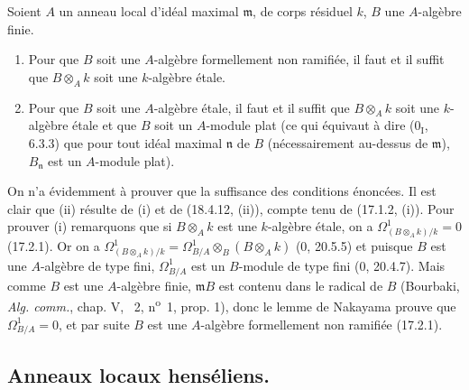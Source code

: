 \begin{corollary}[18.4.14]
\label{IV.18.4.14}
Soient $A$ un anneau local d'idéal maximal $\mathfrak m$, de corps résiduel $k$, $B$ une $A$-algèbre finie.


\begin{enumerate}
  \item[(i)] Pour que $B$ soit une $A$-algèbre formellement non ramifiée, il faut et il suffit que $B\otimes_A k$ soit une $k$-algèbre étale.
  \item[(ii)] Pour que $B$ soit une $A$-algèbre étale, il faut et il suffit que $B\otimes_A k$ soit une $k$-algèbre étale et que $B$ soit un $A$-module plat (ce qui équivaut à dire ($0_{\mathrm I}$, 6.3.3) que pour tout idéal maximal $\mathfrak n$ de $B$ (nécessairement au-dessus de $\mathfrak m$), $B_{\mathfrak n}$ est un $A$-module plat).
\end{enumerate}
\end{corollary}

On n'a évidemment à prouver que la suffisance des conditions énoncées. Il est clair que (ii) résulte de (i) et de (18.4.12, (ii)), compte tenu de (17.1.2, (i)). Pour prouver (i) remarquons que si $B\otimes_A k$ est une $k$-algèbre étale, on a $\Omega^1_{(B\otimes_A k)/k}=0$ (17.2.1). Or on a $\Omega^1_{(B\otimes_A k)/k}=\Omega^1_{B/A}\otimes_B(B\otimes_A k)$ (0, 20.5.5) et puisque $B$ est une $A$-algèbre de type fini, $\Omega^1_{B/A}$ est un $B$-module de type fini (0, 20.4.7). Mais comme $B$ est une $A$-algèbre finie, $\mathfrak mB$ est contenu dans le radical de $B$ (Bourbaki, \emph{Alg. comm.}, chap. V, \textsection~2, n\textsuperscript{o}~1, prop. 1), donc le lemme de Nakayama prouve que $\Omega^1_{B/A}=0$, et par suite $B$ est une $A$-algèbre formellement non ramifiée (17.2.1).

\subsection{Anneaux locaux henséliens\texorpdfstring{\protect\footnotemark}{}.}

